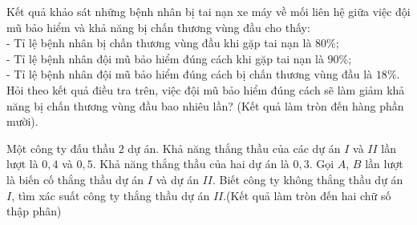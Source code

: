 \begin{ex}%
	Kết quả khảo sát những bệnh nhân bị tai nạn xe máy về mối liên hệ giữa việc đội mũ bảo hiểm và khả năng bị chấn thương vùng đầu cho thấy:\\
	- Tỉ lệ bệnh nhân bị chấn thương vùng đầu khi gặp tai nạn là $80 \%$;\\
	- Tỉ lệ bệnh nhân đội mũ bảo hiểm đúng cách khi gặp tai nạn là $90 \%$;\\
	- Tỉ lệ bệnh nhân đội mũ bảo hiểm đúng cách bị chấn thương vùng đầu là $18 \%$.\\
	Hỏi theo kết quả điều tra trên, việc đội mũ bảo hiểm đúng cách sẽ làm giảm khả năng bị chấn thương vùng đầu bao nhiêu lần? (Kết quả làm tròn đến hàng phần mười).
\end{ex} 

\begin{ex}%
	Một công ty đấu thầu $2$ dự án. Khả năng thắng thầu của các dự án $I$ và $II$ lần lượt là $0{,}4$ và $0{,}5$. Khả năng thắng thầu của hai dự án là $0{,}3$. Gọi $A$, $B$ lần lượt là biến cố thắng thầu dự án $I$ và dự án $II$. Biết công ty không thắng thầu dự án $I$, tìm xác suất công ty thắng thầu dự án $II$.(Kết quả làm tròn đến hai chữ số thập phân)
\end{ex}

